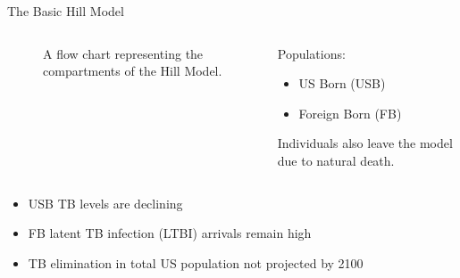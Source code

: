 \documentclass[final]{beamer}
\begin{document}
\begin{frame}
\begin{columns}[T]
\begin{column}{.3\textwidth}
\begin{block}{The Basic Hill Model}
\begin{columns}[T]
\begin{column}{.5\textwidth}
\begin{figure}[h]
\begin{center}
              \end{center}
              \caption{A flow chart representing the compartments of the Hill Model.}
              \label{fig:hillFlow}
            \end{figure}
          \end{column}
          \begin{column}{.45\textwidth}
              \vspace{1.5em}
            Populations:
            \begin{itemize}
              \item US Born (USB) 
              \item Foreign Born (FB)
            \end{itemize}
            Individuals also leave the model due to natural death.
          \end{column}
        \end{columns}

        \vspace{1em}
        \begin{itemize}
          \item USB TB levels are declining
          \item FB latent TB infection (LTBI) arrivals remain high
          \item TB elimination in total US population not projected by 2100
        \end{itemize}


\end{block}
\end{column}
\end{columns}
\end{frame}
\end{document}
